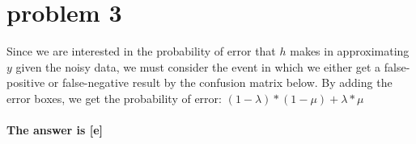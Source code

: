 \documentclass{article}
\begin{document}
\section*{problem 3}
Since we are interested in the probability of error that $h$ makes in approximating $y$ given the noisy data, we must consider the event in which we either get a false-positive or false-negative result by the confusion matrix below. By adding the error boxes, we get the probability of error: $(1-\lambda) * (1-\mu) + \lambda * \mu$
\\ \\
\textbf{The answer is [e]}
\end{document}
